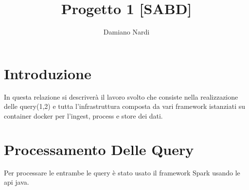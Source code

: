 \documentclass[acmsmall]{acmart}
\begin{document}
\title{Progetto 1 [SABD]}

\author{Damiano Nardi}













\section{Introduzione}
In questa relazione si descriverà il lavoro svolto che consiste nella realizzazione delle query(1,2) e tutta l'infrastruttura  composta da vari framework istanziati su container docker per l'ingest, process e store dei dati.


\section{Processamento Delle Query}
Per processare le entrambe le query è stato usato il framework Spark usando le api java.
\end{document}
